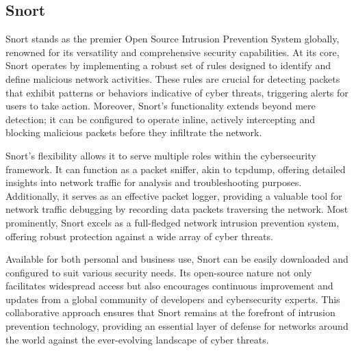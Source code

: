 \subsection{Snort}
\vspace{-18pt}
Snort stands as the premier Open Source Intrusion Prevention System globally, renowned for its versatility and comprehensive security capabilities. At its core, Snort operates by implementing a robust set of rules designed to identify and define malicious network activities. These rules are crucial for detecting packets that exhibit patterns or behaviors indicative of cyber threats, triggering alerts for users to take action. Moreover, Snort's functionality extends beyond mere detection; it can be configured to operate inline, actively intercepting and blocking malicious packets before they infiltrate the network.\par 
Snort's flexibility allows it to serve multiple roles within the cybersecurity framework. It can function as a packet sniffer, akin to tcpdump, offering detailed insights into network traffic for analysis and troubleshooting purposes. Additionally, it serves as an effective packet logger, providing a valuable tool for network traffic debugging by recording data packets traversing the network. Most prominently, Snort excels as a full-fledged network intrusion prevention system, offering robust protection against a wide array of cyber threats.\par 
Available for both personal and business use, Snort can be easily downloaded and configured to suit various security needs. Its open-source nature not only facilitates widespread access but also encourages continuous improvement and updates from a global community of developers and cybersecurity experts. This collaborative approach ensures that Snort remains at the forefront of intrusion prevention technology, providing an essential layer of defense for networks around the world against the ever-evolving landscape of cyber threats.
\vspace{-10pt}
